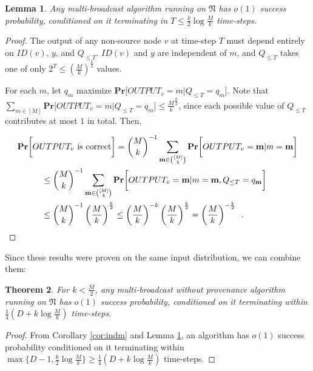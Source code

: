\documentclass{article}
\newcommand{\Prob}[1]{\mathbf{Pr}\bigg[#1\bigg]}
\newtheorem{theorem}{Theorem}
\newtheorem{lemma}[theorem]{Lemma}
\newcommand{\net}{\ensuremath{\mathfrak{N}}\xspace}
\begin{document}
\begin{lemma}\label{lem:indm}
	Any multi-broadcast algorithm running on $\net$ has $o(1)$ success probability, conditioned on it terminating in $T\leq\frac k2 \log \frac Mk$ time-steps.
\end{lemma}

\begin{proof}
	The output of any non-source node $v$ at time-step $T$ must depend entirely on $ID(v)$, $y$, and $Q_{\leq T}$. $ID(v)$ and $y$ are independent of $m$, and $Q_{\leq T}$ takes one of only $2^T\leq \left(\frac{M}{k}\right)^\frac k2$ values.
	
	For each $m$, let $q_m$ maximize $\Prob{OUTPUT_v = m|Q_{\leq T} = q_m}$. Note that $\sum_{m \in [M]} \Prob{OUTPUT_v = m|Q_{\leq T} = q_m} \leq\frac{M}{k}^\frac k2$, since each possible value of $Q_{\leq T}$ contributes at most $1$ in total. Then,
	
	\begin{align*}
	&\Prob{OUTPUT_v \text{ is correct}} = \binom{M}{k}^{-1} \sum\limits_{\textbf m\in\binom{[M]}{k}} \Prob{OUTPUT_v =\textbf m | m = \textbf m}\\
	&\hspace{1cm}\leq \binom{M}{k}^{-1} \sum\limits_{\textbf{m}\in\binom{[M]}{k}} \Prob{OUTPUT_v =\textbf{m} | m =\textbf{m}, Q_{\leq T} = q_\textbf{m}}\\
	&\hspace{1cm}\leq \binom{M}{k}^{-1}\left(\frac{M}{k}\right)^\frac k2\leq  \left(\frac{M}{k}\right)^{-k}\left(\frac{M}{k}\right)^\frac k2 = \left(\frac{M}{k}\right)^{-\frac k2} \enspace.
	\end{align*}
\end{proof}

Since these results were proven on the same input distribution, we can combine them:

\begin{theorem}
	\label{the:BLB}
	For $k<\frac M2$, any multi-broadcast without provenance algorithm running on $\net$ has $o(1)$ success probability, conditioned on it terminating within $\frac 14(D+k\log \frac Mk)$ time-steps. 
\end{theorem}

\begin{proof}
	From Corollary \ref{cor:indm} and Lemma \ref{lem:indm}, an algorithm has $o(1)$ success probability conditioned on it terminating within $\max\{D-1,\frac k2 \log \frac Mk\}\geq\frac 14(D+k\log \frac Mk)$ time-steps.
\end{proof}
\end{document}
